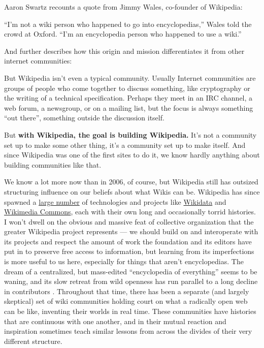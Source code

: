 Aaron Swartz recounts a quote from Jimmy Wales, co-founder of Wikipedia:

\begin{leftbar}
``I'm not a wiki person who happened to go into encyclopedias,'' Wales
told the crowd at Oxford. ``I'm an encyclopedia person who happened to
use a wiki.'' \citep{swartzWhoWritesWikipedia2006} 
\end{leftbar}

And further describes how this origin and mission differentiates it from
other internet communities:

\begin{leftbar}
But Wikipedia isn't even a typical community. Usually Internet
communities are groups of people who come together to discuss something,
like cryptography or the writing of a technical specification. Perhaps
they meet in an IRC channel, a web forum, a newsgroup, or on a mailing
list, but the focus is always something ``out there'', something outside
the discussion itself.

But \textbf{with Wikipedia, the goal is building Wikipedia.} It's not a
community set up to make some other thing, it's a community set up to
make itself. And since Wikipedia was one of the first sites to do it, we
know hardly anything about building communities like that. \citep{swartzMakingMoreWikipedias2006} 
\end{leftbar}

We know a lot more now than in 2006, of course, but Wikipedia still has
outsized structuring influence on our beliefs about what Wikis can be.
Wikipedia has since spawned a
\href{https://meta.wikimedia.org/wiki/Complete_list_of_Wikimedia_projects}{large
number} of technologies and projects like
\href{https://meta.wikimedia.org/wiki/Wikidata}{Wikidata} and
\href{https://commons.wikimedia.org/wiki/Main_Page}{Wikimedia Commons},
each with their own long and occasionally torrid histories. I won't
dwell on the obvious and massive feat of collective organization that the
greater Wikipedia project represents --- we should build on and
interoperate with its projects and respect the amount of work the
foundation and its editors have put in to preserve free access to
information, but learning from its imperfections is more useful to us
here, especially for things that aren't encyclopedias. The dream of a
centralized, but mass-edited ``encyclopedia of everything'' seems to be
waning, and its slow retreat from wild openness has run parallel to a
long decline in contributors \citep{hillWikipediaEndOpen2019, halfakerRiseDeclineOpen2013} . Throughout that time, there has been a
separate (and largely skeptical) set of wiki communities holding court
on what a radically open web can be like, inventing their worlds in real
time. These communities have histories that are continuous with one
another, and in their mutual reaction and inspiration sometimes teach
similar lessons from across the divides of their very different
structure.

